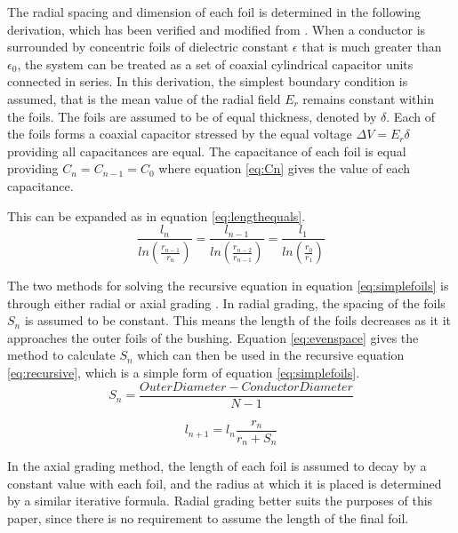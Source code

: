 The radial spacing and dimension of each foil is determined in the following derivation, which has been verified and modified from \cite{kuffel2000high}.
When a conductor is surrounded by concentric foils of dielectric constant $\epsilon$ that is much greater than $\epsilon_{0}$, the system can be treated as a set of coaxial cylindrical capacitor units connected in series.
In this derivation, the simplest boundary condition is assumed, that is the mean value of the radial field $E_r$ remains constant within the foils.
The foils are assumed to be of equal thickness, denoted by $\delta$.
Each of the foils forms a coaxial capacitor stressed by the equal voltage $\Delta V = E_{r}\delta$ providing all capacitances are equal.
The capacitance of each foil is equal providing $C_n = C_{n-1} = C_0$ where equation \ref{eq:Cn} gives the value of each capacitance.


This can be expanded as in equation \ref{eq:lengthequals}.
\begin{equation}
   \label{eq:lengthequals}
   \frac{l_n}{ln(\frac{r_{n-1}}{r_{n}})} = \frac{l_{n-1}}{ln(\frac{r_{n-2}}{r_{n-1}})} = \frac{l_1}{ln(\frac{r_{0}}{r_{1}})}
\end{equation}



The two methods for solving the recursive equation in equation \ref{eq:simplefoils} is through either radial or axial grading \cite{Ahmed11}.
In radial grading, the spacing of the foils $S_n$ is assumed to be constant. 
This means the length of the foils decreases as it it approaches the outer foils of the bushing.
Equation \ref{eq:evenspace} gives the method to calculate $S_n$ which can then be used in the recursive equation \ref{eq:recursive}, which is a simple form of equation \ref{eq:simplefoils}.
\begin{equation}
   \label{eq:evenspace}
  S_n = \frac{Outer Diameter - Conductor Diameter}{N-1}
\end{equation}

\begin{equation}
   \label{eq:recursive}
  l_{n+1}= l_{n}\frac{r_{n}}{r_{n} + S_{n}}
\end{equation}

In the axial grading method, the length of each foil is assumed to decay by a constant value with each foil, and the radius at which it is placed is determined by a similar iterative formula.
Radial grading better suits the purposes of this paper, since there is no requirement to assume the length of the final foil.

